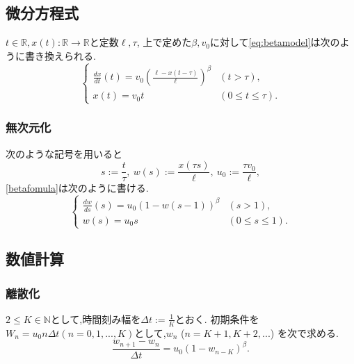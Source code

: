 \documentclass [dvipdfmx] {jsarticle}
\numberwithin{equation}{section}
\theoremstyle{definition} %
\theoremstyle{definition} %
\begin{document}


\subsection{微分方程式}
$t\in\mathbb{R},x(t)\colon\mathbb{R}\rightarrow\mathbb{R}$と定数$\ell,\tau$,
上で定めた$\beta,v_0$に対して\eqref{eq:betamodel}は次のように書き換えられる.
\begin{equation}\label{betafomula}\begin{cases}
    \displaystyle\frac{dx}{dt}(t)=v_0\left(\frac{\ell-x(t-\tau)}{\ell}\right)^\beta &(t>\tau),\\
    x(t)=v_0 t &(0\le t \le \tau).
\end{cases}\end{equation}


\subsubsection{無次元化}
次のような記号を用いると
\begin{equation}
    s:=\frac{t}{\tau},\ w(s):=\frac{x(\tau s)}{\ell},\ u_0:=\frac{\tau v_0}{\ell},
\end{equation}
\eqref{betafomula}は次のように書ける.
\begin{equation}\label{betafomula2}\begin{cases}
    \displaystyle\frac{dw}{ds}(s)=u_0(1-w(s-1))^\beta &(s>1),\\
    w(s)=u_0 s &(0\le s \le 1).
\end{cases}\end{equation}


\subsection{数値計算}


\subsubsection{離散化}
$2\le K\in\mathbb{N}$として,時間刻み幅を$\Delta t:=\frac{1}{K}$とおく.
初期条件を$W_n=u_0n\Delta t (n=0,1,...,K)$として,$w_n $ ($n=K+1,K+2,...$)
を次で求める.
\begin{equation}
    \displaystyle\frac{w_{n+1}-w_n}{\Delta t}=u_0(1-w_{n-K})^\beta.
\end{equation}
\end{document}
